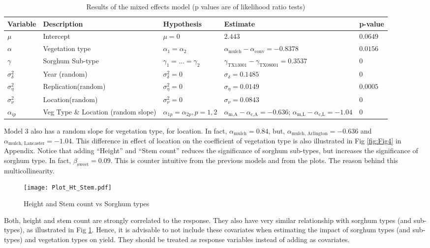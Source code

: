 \begin{table}[H] \centering 
\small
\begin{tabular}{ l | p{3.5cm} | l | p{4.5cm} | l }
\hline 
\hline
Variable & Description & Hypothesis & Estimate & p-value \\
\hline
$\mu$ 		& Intercept 		& $\mu = 0$ 			& $2.443$ 							& $0.0649$ \\
$\alpha$	& Vegetation type 	& $\alpha_1 = \alpha_2 $ 	& $\alpha_{\text{mulch}} - \alpha_{\text{conv}} = -0.8378$ 	& $0.0156$ \\
$\gamma$	& Sorghum Sub-type 	& $\gamma_1 = \dots = \gamma_2$	& $\gamma_{\text{TX13001}} - \gamma_{\text{TX08001}}= 0.3537$	& $0$ \\
$\sigma_{\delta}^2$ & Year (random)	& $\sigma_{\delta}^2 = 0$	& $\sigma_{\delta} = 0.1485$					& $0$ \\
$\sigma_{\eta}^2$ & Replication(random)	& $\sigma_{\eta}^2 = 0$		& $\sigma_{\eta} = 0.0149$					& $0.0005$ \\
$\sigma_{\nu}^2$ & Location(random)	& $\sigma_{\nu}^2 = 0$		& $\sigma_{\nu} = 0.0843$					& $0$ \\
$\alpha_{ip}$ 	& Veg Type \& Location (random slope)	& $\alpha_{1p} = \alpha_{2p}, p = 1,2$		& $\alpha_{\text{m,A}} - \alpha_{\text{c,A}} = -0.636$; $\alpha_{\text{m,L}} - \alpha_{\text{c,L}} = -1.04$ & $0$ \\
\hline
\end{tabular} 
\caption{Results of the mixed effects model (p values are of likelihood ratio tests)} 
\label{Tab:Tab10} 
\end{table} 

Model 3 also has a random slope for vegetation type, for location. In fact, $\alpha_{\text{mulch}} = 0.84$, but, $\alpha_{\text{mulch, Arlington}} = -0.636$ and $\alpha_{\text{mulch, Lancaster}} = -1.04$. This difference in effect of location on the coefficient of vegetation type is also illustrated in Fig \ref{fig:Fig4} in Appendix. Notice that adding ``Height'' and ``Stem count'' reduces the significance of sorghum sub-types, but increases the significance of sorghum type. In fact, $\beta_{\text{sweet}} = 0.09$. This is counter intuitive from the previous models and from the plots. The reason behind this multicollinearity. 
\vspace{-1cm}
\begin{figure}[H]
\centering
\texttt{[image: Plot\_Ht\_Stem.pdf]}
\caption{Height and Stem count vs Sorghum types}
\label{fig:Fig5}
\end{figure}
Both, height and stem count are strongly correlated to the response. They also have very similar relationship with sorghum types (and sub-types), as illustrated in Fig \ref{fig:Fig5}. Hence, it is advisable to not include these covariates when estimating the impact of sorghum types (and sub-types) and vegetation types on yield. They should be treated as response variables instead of adding as covariates.

